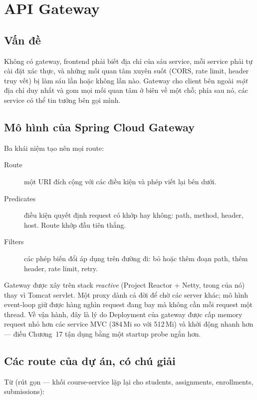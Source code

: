 \chapter{API Gateway}
\label{ch:gateway}

\section{Vấn đề}

Không có gateway, frontend phải biết địa chỉ của sáu service, mỗi
service phải tự cài đặt xác thực, và những mối quan tâm xuyên suốt
(CORS, rate limit, header truy vết) bị làm sáu lần hoặc không lần nào.
Gateway cho client bên ngoài \emph{một} địa chỉ duy nhất và gom mọi mối
quan tâm ở biên về một chỗ; phía sau nó, các service có thể tin tưởng
bên gọi mình.

\section{Mô hình của Spring Cloud Gateway}

Ba khái niệm tạo nên mọi route:

\begin{description}
  \item[Route] một URI đích cộng với các điều kiện và phép viết lại bên
  dưới.
  \item[Predicates] điều kiện quyết định request có khớp hay không:
  path, method, header, host. Route khớp đầu tiên thắng.
  \item[Filters] các phép biến đổi áp dụng trên đường đi:
  bỏ hoặc thêm đoạn path, thêm header, rate limit, retry.
\end{description}

Gateway được xây trên stack \emph{reactive} (Project Reactor +
Netty,  trong
 của nó) thay vì Tomcat servlet. Một proxy dành cả
đời để chờ các server khác; mô hình event-loop giữ được hàng nghìn
request đang bay mà không cần mỗi request một thread. Về vận hành, đây
là lý do Deployment của gateway được cấp memory request nhỏ hơn các
service MVC (384\,Mi so với 512\,Mi) và khởi động nhanh hơn ---
điều Chương~17 tận dụng bằng một startup probe ngắn hơn.

\section{Các route của dự án, có chú giải}

Từ  (rút gọn --- khối
course-service lặp lại cho students, assignments, enrollments,
submissions):

